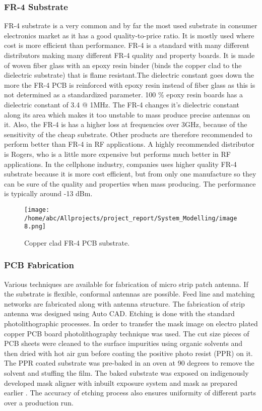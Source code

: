 \documentclass[12pt]{article}
\begin{document}
	             \subsubsection{FR-4 Substrate}
		           \justify
		            FR-4 substrate is a very common and by far the most used substrate in consumer electronics market as it has a good quality-to-price ratio. It is mostly used where cost is more efficient than performance. FR-4 is a standard with many different distributors making many different FR-4 quality and property boards. It is made of woven fiber glass with an epoxy resin binder (binds the copper clad to the dielectric substrate) that is flame resistant.The dielectric constant goes down the more the FR-4 PCB is reinforced with epoxy resin instead of fiber glass as this is not determined as a standardized parameter. 100 \% epoxy resin boards has a dielectric constant of 3.4 @ 1MHz.
		           \justify
		           	The FR-4 changes it’s dielectric constant along its area which makes it too unstable to mass produce precise antennas on it. Also, the FR-4 is has a higher loss at frequencies over 3GHz, because of the sensitivity of the cheap substrate. Other products are therefore recommended to perform better than FR-4 in RF applications. A highly recommended distributor is Rogers, who is a little more expensive but performs much better in RF applications. In the cellphone industry, companies uses higher quality FR-4 substrate because it is more cost efficient, but from only one manufacture so they can be sure of the quality and properties when mass producing. The performance is typically around -13 dBm.\\
					
		            \begin{figure}[H]
		            	\centering
		            	\texttt{[image: /home/abc/Allprojects/project\_report/System\_Modelling/image8.png]}
		            	\caption{Copper clad FR-4 PCB substrate.}	             	
		            \end{figure}
		             		   
	
		        \subsubsection{PCB Fabrication}
		         \justify
		          Various techniques are available for fabrication of micro strip patch antenna. If the substrate is flexible, conformal antennas are possible. Feed line and matching networks are fabricated along with antenna structure. The fabrication of strip antenna was designed using Auto CAD. Etching is done with the standard photolithographic processes. In order to transfer the mask image on electro plated copper PCB board photolithography technique was used. The cut size pieces of PCB sheets were cleaned to the surface impurities using organic solvents and then dried with hot air gun before coating the positive photo resist (PPR) on it. The PPR coated substrate was pre-baked in an oven at 90 degrees to remove the solvent and stuffing the film. The baked substrate was exposed on indigenously developed mask aligner with inbuilt exposure system and mask as prepared earlier . The accuracy of etching process also ensures uniformity of different parts over a production run.
\end{document}
